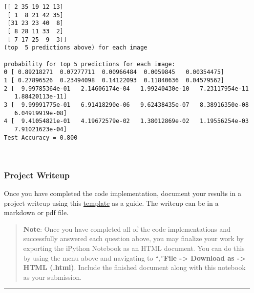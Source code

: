 \documentclass[11pt]{article}
\begin{document}
    \begin{Verbatim}[commandchars=\\\{\}]
[[ 2 35 19 12 13]
 [ 1  8 21 42 35]
 [31 23 23 40  8]
 [ 8 28 11 33  2]
 [ 7 17 25  9  3]]
(top  5 predictions above) for each image

probability for top 5 predictions for each image:
0 [ 0.89218271  0.07277711  0.00966484  0.0059845   0.00354475]
1 [ 0.27896526  0.23494098  0.14122093  0.11840636  0.04579562]
2 [  9.99785364e-01   2.14606174e-04   1.99240430e-10   7.23117954e-11
   1.88420113e-11]
3 [  9.99991775e-01   6.91418290e-06   9.62438435e-07   8.38916350e-08
   6.04919919e-08]
4 [  9.41054821e-01   4.19672579e-02   1.38012869e-02   1.19556254e-03
   7.91021623e-04]
Test Accuracy = 0.800

    \end{Verbatim}

    \begin{center}
    \end{center}
    { \hspace*{\fill} \\}
    
    \hypertarget{project-writeup}{%
\subsubsection{Project Writeup}\label{project-writeup}}

Once you have completed the code implementation, document your results
in a project writeup using this
\href{https://github.com/udacity/CarND-Traffic-Sign-Classifier-Project/blob/master/writeup_template.md}{template}
as a guide. The writeup can be in a markdown or pdf file.

    \begin{quote}
\textbf{Note}: Once you have completed all of the code implementations
and successfully answered each question above, you may finalize your
work by exporting the iPython Notebook as an HTML document. You can do
this by using the menu above and navigating to \n``,''\textbf{File
-\textgreater{} Download as -\textgreater{} HTML (.html)}. Include the
finished document along with this notebook as your submission.
\end{quote}

    \begin{center}\rule{0.5\linewidth}{\linethickness}\end{center}
\end{document}
